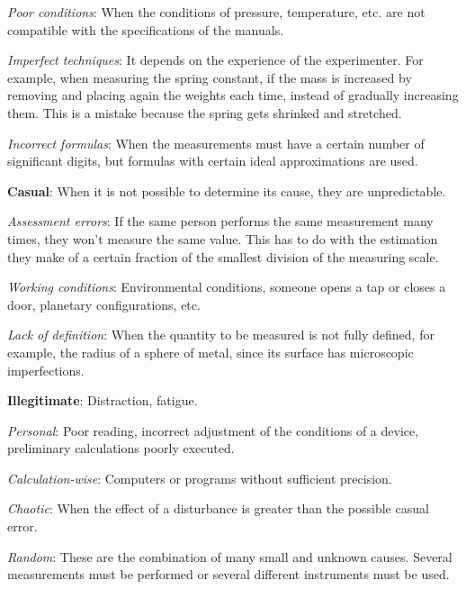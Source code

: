 		\item \textit{Poor conditions}:
When the conditions of pressure, temperature, etc. are not compatible with the specifications of the manuals.

		\item \textit{Imperfect techniques}:
It depends on the experience of the experimenter. For example, when measuring the spring constant, if the mass is increased by removing and placing again the weights each time, instead of gradually increasing them. This is a mistake because the spring gets shrinked and stretched.

		\item \textit{Incorrect formulas}:
When the measurements must have a certain number of significant digits, but formulas with certain ideal approximations are used.
	\ei

	\item \textbf{Casual}: When it is not possible to determine its cause, they are unpredictable.
	\bi
		\item \textit{Assessment errors}:
If the same person performs the same measurement many times, they won't measure the same value. This has to do with the estimation they make of a certain fraction of the smallest division of the measuring scale.

		\item \textit{Working conditions}: Environmental conditions, someone opens a tap or closes a door, planetary configurations, etc.

		\item \textit{Lack of definition}: When the quantity to be measured is not fully defined, for example, the radius of a sphere of metal, since its surface has microscopic imperfections.
	\ei

	\item \textbf{Illegitimate}: Distraction, fatigue.
	\bi
		\item \textit{Personal}: Poor reading, incorrect adjustment of the conditions of a device, preliminary calculations poorly executed.

		\item \textit{Calculation-wise}: Computers or programs without sufficient precision.

		\item \textit{Chaotic}: When the effect of a disturbance is greater than the possible casual error.

		\item \textit{Random}: These are the combination of many small and unknown causes. Several measurements must be performed or several different instruments must be used.
	\ei
\een

